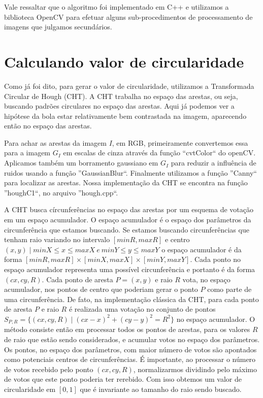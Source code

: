 \documentclass[11pt,a4paper]{article}
\begin{document}
Vale ressaltar que o algoritmo foi implementado em C++ e utilizamos a biblioteca OpenCV para efetuar alguns sub-procedimentos de processamento de imagens que julgamos secundários.

\section{Calculando valor de circularidade}

 Como já foi dito, para gerar o valor de circularidade, utilizamos a Transformada Circular de Hough (CHT). A CHT trabalha no espaço das arestas, ou seja, buscando padrões circulares no espaço das arestas. Aqui já podemos ver a hipótese da bola estar relativamente bem contrastada na imagem, aparecendo então no espaço das arestas.

 Para achar as arestas da imagem $I$, em RGB, primeiramente convertemos essa para a imagem $G_I$ em escalas de cinza através da função ``cvtColor`` do openCV. Aplicamos também um borramento gaussiano em $G_I$ para reduzir a influência de ruidos usando a função ''GaussianBlur``. Finalmente utilizamos a função ''Canny`` para localizar as arestas. Nossa implementação da CHT se encontra na função ''houghC1``, no arquivo ''hough.cpp``.

 A CHT busca círcunferências no espaço das arestas por um esquema de votação em um espaço acumulador. O espaço acumulador é o espaço dos parâmetros da circunferência que estamos buscando. Se estamos buscando circunferências que tenham raio variando no intervalo $[minR,maxR]$ e centro $(x,y) \mid minX \leq x \leq maxX ~e~ minY \leq y \leq maxY $ o espaço acumulador é da forma $[minR,maxR]\times[minX,maxX]\times[minY,maxY]$. Cada ponto no espaço acumulador representa uma possível circunferência e portanto é da forma $(cx,cy,R)$. Cada ponto de aresta $P = (x,y)$ e raio $R$ vota, no espaço acumulador, nos pontos de centro que poderiam gerar o ponto $P$ como parte de uma circunferência. De fato, na implementação clássica da CHT, para cada ponto de aresta $P$ e raio $R$ é realizada uma votação no conjunto de pontos $S_{P,R} = \{ (cx,cy,R) \mid (cx - x)^2 + (cy - y)^2 = R^2\}$ no espaço acumulador. O método consiste então em processar todos os pontos de arestas, para os valores $R$ de raio que estão sendo considerados, e acumular votos no espaço dos parâmetros. Os pontos, no espaço dos parâmetros, com maior número de votos são apontados como potenciais centros de circunferências. É importante, ao processar o número de votos recebido pelo ponto $(cx,cy,R)$, normalizarmos dividindo pelo máximo de votos que este ponto poderia ter rerebido. Com isso obtemos um valor de circularidade em $[0,1]$ que é invariante ao tamanho do raio sendo buscado.
\end{document}
